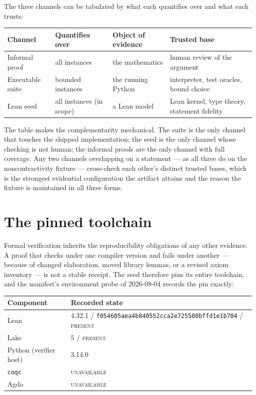 The three channels can be tabulated by what each quantifies over and
what each trusts:

\begin{center}
\small
\begin{tabular}{@{}lp{3.4cm}p{3.4cm}p{3.6cm}@{}}
\toprule
Channel & Quantifies over & Object of evidence & Trusted base \\
\midrule
Informal proof & all instances & the mathematics & human review of the argument \\
Executable suite & bounded instances & the running Python & interpreter, test oracles, bound choice \\
Lean seed & all instances (in scope) & a Lean model & Lean kernel, type theory, statement fidelity \\
\bottomrule
\end{tabular}
\end{center}

The table makes the complementarity mechanical. The suite is the only
channel that touches the shipped implementation; the seed is the only
channel whose checking is not human; the informal proofs are the only
channel with full coverage. Any two channels overlapping on a statement
--- as all three do on the noncontractivity fixture --- cross-check
each other's distinct trusted bases, which is the strongest evidential
configuration the artifact attains and the reason the fixture is
maintained in all three forms.

\section{The pinned toolchain}\label{ch11:sec:toolchain}

Formal verification inherits the reproducibility obligations of any other
evidence. A proof that checks under one compiler version and fails under
another --- because of changed elaboration, moved library lemmas, or a
revised axiom inventory --- is not a stable receipt. The seed therefore
pins its entire toolchain, and the manifest's environment probe of
2026-08-04 records the pin exactly:

\begin{center}
\begin{tabular}{@{}ll@{}}
\toprule
Component & Recorded state \\
\midrule
Lean & 4.32.1 / \texttt{f054605aea4b840552cca2e725580bffd1e1b704} / \textsc{present} \\
Lake & 5 / \textsc{present} \\
Python (verifier host) & 3.14.0 \\
\texttt{coqc} & \textsc{unavailable} \\
Agda & \textsc{unavailable} \\
\bottomrule
\end{tabular}
\end{center}


